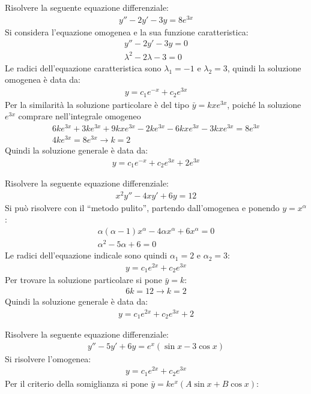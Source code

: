 \documentclass{article}
\numberwithin{equation}{subsection}
\begin{document}
Risolvere la seguente equazione differenziale:
\begin{gather*}
    y''-2y'-3y=8e^{3x}
\end{gather*}
Si considera l'equazione omogenea e la sua funzione caratteristica:
\begin{gather*}
    y''-2y'-3y=0\\
    \lambda^2-2\lambda-3=0
\end{gather*}
Le radici dell'equazione caratteristica sono $\lambda_1=-1$ e $\lambda_2=3$, quindi la soluzione omogenea è data da:
\begin{gather*}
    y=c_1e^{-x}+c_2e^{3x}
\end{gather*}
Per la similarità la soluzione particolare è del tipo $\bar{y}=kxe^{3x}$, poiché la soluzione $e^{3x}$ comprare nell'integrale omogeneo
\begin{gather*}
    6ke^{3x}+3ke^{3x}+9kxe^{3x}-2ke^{3x}-6kxe^{3x}-3kxe^{3x}=8e^{3x}\\
    4ke^{3x}=8e^{3x}\to k=2
\end{gather*}
Quindi la soluzione generale è data da:
\begin{gather*}
    y=c_1e^{-x}+c_2e^{3x}+2e^{3x}
\end{gather*}


Risolvere la seguente equazione differenziale:
\begin{gather*}
    x^2y''-4xy'+6y=12
\end{gather*}
Si può risolvere con il ``metodo pulito'', partendo dall'omogenea e ponendo $y=x^{\alpha}$:
\begin{gather*}
    \alpha(\alpha-1)x^{\alpha}-4\alpha x^\alpha+6x^\alpha=0\\
    \alpha^2-5\alpha+6=0
\end{gather*}
Le radici dell'equazione indicale sono quindi $\alpha_1=2$ e $\alpha_2=3$:
\begin{gather*}
    y=c_1e^{2x}+c_2e^{3x}
\end{gather*}
Per trovare la soluzione particolare si pone $\bar{y}=k$:
\begin{gather*}
    6k=12\to k=2
\end{gather*}
Quindi la soluzione generale è data da:
\begin{gather*}
    y=c_1e^{2x}+c_2e^{3x}+2
\end{gather*}



Risolvere la seguente equazione differenziale:
\begin{gather*}
    y''-5y'+6y=e^x(\sin x-3\cos x)
\end{gather*}
Si risolvere l'omogenea:
\begin{gather*}
    y=c_1e^{2x}+c_2e^{3x}
\end{gather*}
Per il criterio della somiglianza si pone $\bar{y}=ke^{x}(A\sin x+B\cos x)$:
\end{document}
